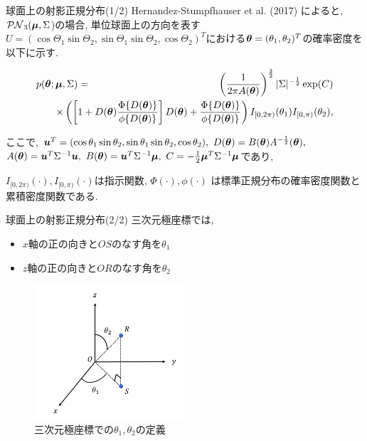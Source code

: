 \documentclass[dvipdfmx]{beamer} %
\newcommand{\bm}[1]{\mbox{\boldmath $#1$}}
\begin{document}
\begin{frame}{球面上の射影正規分布(1/2)}
Hernandez-Stumpfhauser et al. (2017) によると, $\mathcal{PN}_3(\bm \mu,\Sigma$)の場合, 単位球面上の方向を表す$U = (\cos\Theta_1 \sin \Theta_2, \sin\Theta_1 \sin \Theta_2, \cos \Theta_2)^T$における$\bm \theta = (\theta_1, \theta_2)^T$の確率密度を以下に示す.

\vspace{-0.5cm}
\footnotesize %
\begin{eqnarray*}
\label{PNS}
p(\bm \theta; \bm \mu, \Sigma) &=& \left(\frac{1}{2\pi A(\bm \theta)}\right)^{\frac{3}{2}} |\Sigma|^{-\frac{1}{2}}
\exp(C) \nonumber \\ 
&& \hspace{-1.5cm} \times \left( \left[1 + D(\bm \theta) \frac{\Phi \{D(\bm \theta)\}}{\phi \{D(\bm \theta)\}} \right] D(\bm \theta) + \frac{\Phi \{D(\bm \theta)\}}{\phi \{D(\bm \theta)\}} \right) I_{[0,2\pi)}(\theta_1) I_{[0,\pi)}(\theta_2),
\end{eqnarray*}
\normalsize

ここで, $\bm u^T = (\cos\theta_1 \sin \theta_2, \sin\theta_1 \sin \theta_2, \cos \theta_2), \ D(\bm \theta) = B(\bm \theta) A^{-\frac{1}{2}}(\bm \theta),$
$A(\bm \theta) = \bm u^T \Sigma^{-1} \bm u,\ B(\bm \theta) = \bm u^T \Sigma^{-1} \bm \mu, \ C = -\frac{1}{2} \bm \mu^T \Sigma^{-1} \bm \mu$であり, 

$I_{[0,2\pi)} (\cdot), I_{[0,\pi)}(\cdot)$は指示関数, $\Phi(\cdot), \phi(\cdot)$ は標準正規分布の確率密度関数と累積密度関数である. 
\end{frame}

\begin{frame}{球面上の射影正規分布(2/2)}
三次元極座標では, 
\begin{itemize}
\item 
$x$軸の正の向きと$OS$のなす角を$\theta_1$
	
\item 
$z$軸の正の向きと$OR$のなす角を$\theta_2$
\end{itemize}

\begin{figure}[tbp]
\begin{center}
\includegraphics[clip,height= 50mm]{data/theta_sample.png}
\end{center}
\caption{三次元極座標での$\theta_1, \theta_2$の定義}
\label{thetasample}
\end{figure}
\end{frame}
\end{document}
